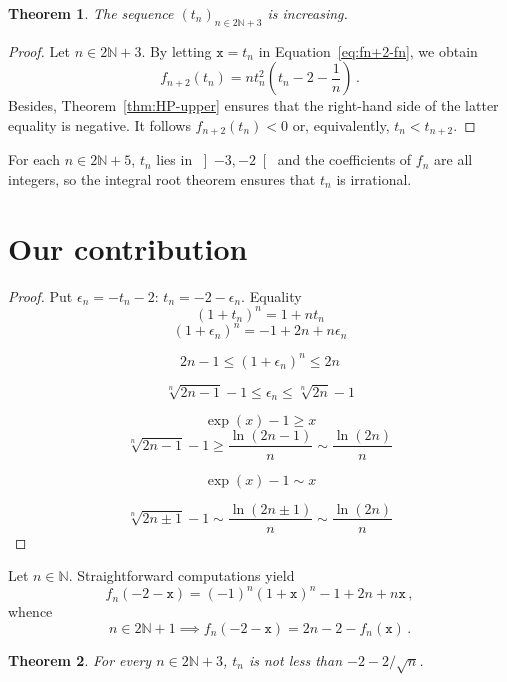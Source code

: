 \documentclass[12pt]{article}
\newcommand{\bN}{\mathbb{N}}
\newcommand{\ttx}{\mathtt{x}}
\newtheorem{theorem}{Theorem}
\begin{document}
 
 
\begin{theorem} \label{thm:HP-tn-increase} 
  The sequence $\left( t_n \right)_{n \in 2 \bN + 3}$ is increasing.
 \end{theorem} 

 \begin{proof}
 Let $n \in 2 \bN + 3$.
 By letting $\ttx = t_n$ in Equation~\eqref{eq:fn+2-fn}, we obtain
 $$ 
f_{n + 2} (t_n) = n t_n^2 \left(t_n - 2 - \frac{1}{n} \right) \, .
$$
Besides, Theorem~\ref{thm:HP-upper} ensures that the right-hand side of the latter equality is negative.
It follows $f_{n + 2} (t_n) < 0$ or, equivalently, $t_n < t_{n + 2}$.
\end{proof}

For each $n \in 2 \bN + 5$, $t_n$ lies in $\left]- 3, - 2 \right[$ and the coefficients of $f_n$ are all integers,
so the integral root theorem ensures that $t_n$ is irrational.

\section{Our contribution}


\begin{proof}
  Put $\epsilon_n = - t_n - 2$: $t_n = - 2 - \epsilon_n$.
  Equality
  $$
  {(1 + t_n)}^n = 1 + n t_n 
  $$
  $$
   {(1 + \epsilon_n)}^n  = - 1 + 2 n + n \epsilon_n 
   $$

   $$
   2 n - 1 \le {(1 + \epsilon_n)}^n  \le  2 n 
   $$

   $$
   \sqrt[n]{2 n - 1} - 1 \le \epsilon_n  \le \sqrt[n]{2 n} - 1
   $$

   $$
   \exp(x) - 1 \ge x
   $$
   $$
   \sqrt[n]{2n - 1} - 1 \ge \frac{\ln(2n - 1)}{n} \sim \frac{\ln(2n)}{n} 
   $$

   $$
   \exp(x) - 1 \sim  x
   $$
   
   $$
   \sqrt[n]{2n \pm 1} - 1 \sim \frac{\ln(2n \pm 1)}{n} \sim \frac{\ln(2n)}{n} 
   $$
   
\end{proof}
Let $n \in \bN$.
Straightforward computations yield
$$
f_n(- 2 - \ttx) = {(- 1)}^n {(1 + \ttx)}^n - 1 + 2n + n \ttx \, , 
$$
whence 
\begin{equation} \label{eq:fn-2-x-odd}
  n \in 2 \bN + 1
  \implies 
 f_n(- 2 - \ttx) = 2n - 2 - f_n(\ttx)   \, .
\end{equation} 
 
\begin{theorem} \label{thm:lower-sqrt}
  For every $n \in 2 \bN + 3$, $t_n$ is not less than $- 2 - 2 / \sqrt{n}$.
\end{theorem}
\end{document}
